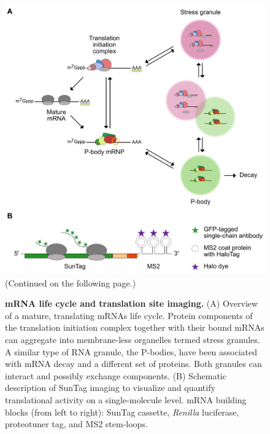 \begin{figure}[b!]
    \centering
    \includegraphics[width=\linewidth]{images/figure1}
    \caption{(Continued on the following page.)}
    \label{fig:introduction}
    \end{figure}
    \addtocounter{figure}{-1}
    \begin{figure} [t!]
    \caption{\textbf{mRNA life cycle and translation site imaging.}
        (A) Overview of a mature, translating mRNAs life cycle.
            Protein components of the translation initiation complex together with their bound
            mRNAs can aggregate into membrane-less organelles termed stress granules.
            A similar type of RNA granule, the P-bodies, have been associated with mRNA
            decay and a different set of proteins.
            Both granules can interact and possibly exchange components.
        (B) Schematic description of SunTag imaging to visualize and quantify
            translational activity on a single-molecule level.
            mRNA building blocks (from left to right): SunTag cassette, \textit{Renilla} luciferase, proteotuner tag, and MS2 stem-loops.
    }
\end{figure}

